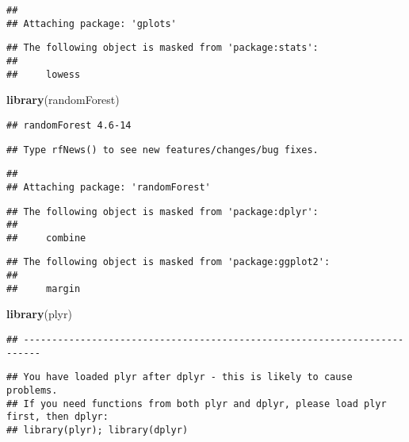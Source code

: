 \documentclass[]{article}
\newenvironment{Shaded}{\begin{snugshade}}{\end{snugshade}}
\newcommand{\KeywordTok}[1]{\textcolor[rgb]{0.13,0.29,0.53}{\textbf{#1}}}
\newcommand{\NormalTok}[1]{#1}
\begin{document}
\begin{verbatim}
## 
## Attaching package: 'gplots'
\end{verbatim}

\begin{verbatim}
## The following object is masked from 'package:stats':
## 
##     lowess
\end{verbatim}

\begin{Shaded}
\begin{Highlighting}[]
\KeywordTok{library}\NormalTok{(randomForest)}
\end{Highlighting}
\end{Shaded}

\begin{verbatim}
## randomForest 4.6-14
\end{verbatim}

\begin{verbatim}
## Type rfNews() to see new features/changes/bug fixes.
\end{verbatim}

\begin{verbatim}
## 
## Attaching package: 'randomForest'
\end{verbatim}

\begin{verbatim}
## The following object is masked from 'package:dplyr':
## 
##     combine
\end{verbatim}

\begin{verbatim}
## The following object is masked from 'package:ggplot2':
## 
##     margin
\end{verbatim}

\begin{Shaded}
\begin{Highlighting}[]
\KeywordTok{library}\NormalTok{(plyr)}
\end{Highlighting}
\end{Shaded}

\begin{verbatim}
## -------------------------------------------------------------------------
\end{verbatim}

\begin{verbatim}
## You have loaded plyr after dplyr - this is likely to cause problems.
## If you need functions from both plyr and dplyr, please load plyr first, then dplyr:
## library(plyr); library(dplyr)
\end{verbatim}
\end{document}
